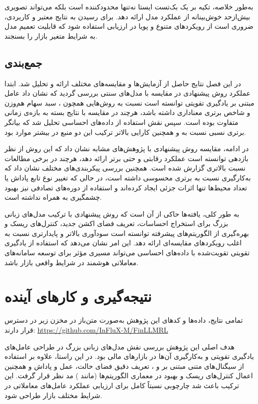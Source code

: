 \documentclass[12pt, a4paper]{report}
\begin{document}
به‌طور خلاصه، تکیه بر یک بک‌تست ایستا نه‌تنها محدودکننده است بلکه می‌تواند تصویری بیش‌ازحد خوش‌بینانه از عملکرد مدل ارائه دهد.  
برای رسیدن به نتایج معتبر و کاربردی، ضروری است از رویکردهای متنوع و پویا در ارزیابی استفاده شود که قابلیت تعمیم مدل به شرایط متغیر بازار را بسنجند.  

\section{جمع‌بندی}

در این فصل نتایج حاصل از آزمایش‌ها و مقایسه‌های مختلف ارائه و تحلیل شد. 
ابتدا عملکرد روش پیشنهادی در مقایسه با مدل‌های سنتی بررسی گردید که نشان داد عامل مبتنی بر یادگیری تقویتی توانسته است نسبت به روش‌هایی همچون ، سبد سهام هم‌وزن و شاخص  برتری معناداری داشته باشد، هرچند در مقایسه با  نتایج بسته به بازه‌ی زمانی متفاوت بوده است. 
سپس نقش استفاده از داده‌های احساسی تحلیل شد که بیانگر برتری نسبی  نسبت به  و همچنین کارایی بالاتر ترکیب این دو منبع در بیشتر موارد بود.  

در ادامه، مقایسه روش پیشنهادی با پژوهش‌های مشابه نشان داد که این روش از نظر بازدهی توانسته است عملکرد رقابتی و حتی برتر ارائه دهد، هرچند در برخی مطالعات نسبت  بالاتری گزارش شده است. 
همچنین بررسی پیکربندی‌های مختلف نشان داد که به‌کارگیری  نسبت به  برتری محسوسی داشته است، در حالی که تغییر نوع تابع پاداش یا تعداد محیط‌ها تنها اثرات جزئی ایجاد کرده‌اند و استفاده از دوره‌های تصادفی نیز بهبود چشمگیری به همراه نداشته است.  

به طور کلی، یافته‌ها حاکی از آن است که روش پیشنهادی با ترکیب مدل‌های زبانی بزرگ برای استخراج احساسات، تعریف فضای اکشن جدید، کنترل‌های ریسک و بهره‌گیری از الگوریتم‌های پیشرفته توانسته است سودآوری بالاتر و پایدارتری نسبت به اغلب رویکردهای مقایسه‌ای ارائه دهد. 
این امر نشان می‌دهد که استفاده از یادگیری تقویتی تقویت‌شده با داده‌های احساسی می‌تواند مسیری مؤثر برای توسعه سامانه‌های معاملاتی هوشمند در شرایط واقعی بازار باشد.


\chapter{نتیجه‌گیری و کارهای آینده}

تمامی نتایج، داده‌ها و کدهای این پژوهش به‌صورت متن‌باز در مخزن زیر در دسترس قرار دارند:  
\url{https://github.com/InFluX-M/FinLLMRL}

هدف اصلی این پژوهش بررسی نقش مدل‌های زبانی بزرگ در طراحی عامل‌های یادگیری تقویتی و به‌کارگیری آن‌ها در بازارهای مالی بود. 
در این راستا، علاوه بر استفاده از سیگنال‌های متنی مبتنی بر  و ، تعریف دقیق فضای حالت، عمل و پاداش و همچنین اعمال کنترل‌های ریسک و بهبود در معماری الگوریتم‌ها (مانند ) مد نظر قرار گرفت. 
این ترکیب باعث شد چارچوبی نسبتاً کامل برای ارزیابی عملکرد عامل‌های معاملاتی در شرایط مختلف بازار طراحی شود.  
\end{document}
